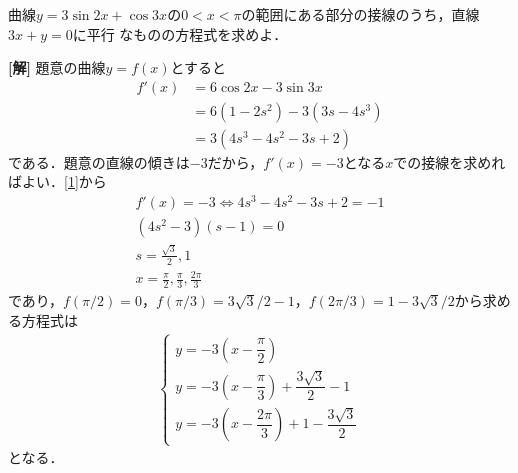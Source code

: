 \documentclass[a4j]{jarticle}
\begin{document}

     \begin{oframed}
     曲線$y=3\sin 2x+\cos 3x$の$0<x<\pi$の範囲にある部分の接線のうち，直線$3x+y=0$に平行
     なものの方程式を求めよ．
     \end{oframed}

\setlength{\columnseprule}{0.4pt}
\begin{multicols}{2}
{\bf[解]} \3 題意の曲線$y=f(x)$とすると
     \begin{align}
     f'(x)&=6\cos 2x-3\sin 3x  \nonumber\\
     &=6(1-2s^2)-3(3s-4s^3)  \nonumber\\
     &=3(4s^3-4s^2-3s+2) \label{1}
     \end{align}
である．題意の直線の傾きは$-3$だから，$f'(x)=-3$となる$x$での接線を求めればよい．\eqref{1}から
     \begin{align*}
     f'(x)=-3     \Longleftrightarrow 4s^3-4s^2-3s+2=-1 \\
     (4s^2-3)(s-1)=0  \\
     s=\frac{\sqrt{3}}{2},1 \tag{$\because0<x<\pi$}\\
     x=\frac{\pi}{2},\frac{\pi}{3},\frac{2\pi}{3}
     \end{align*}
であり，$f(\pi/2)=0$，$f(\pi/3)=3\sqrt{3}/2-1$，$f(2\pi/3)=1-3\sqrt{3}/2$から求める方程式は
     \begin{align*}
     \left\{
          \begin{array}{l}
          y=-3(x-\dfrac{\pi}{2})  \\
          y=-3(x-\dfrac{\pi}{3})+\dfrac{3\sqrt{3}}{2}-1  \\
          y=-3(x-\dfrac{2\pi}{3})+1-\dfrac{3\sqrt{3}}{2}
          \end{array}
     \right.\tag{答}
     \end{align*}
となる．          
\newpage
\end{multicols}
\end{document}
